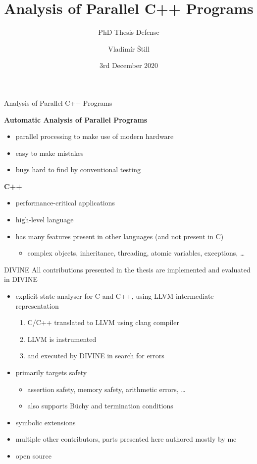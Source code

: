 \documentclass[aspectratio=169, fi]{paradise-slide}
\title{Analysis of Parallel C++ Programs}
\subtitle{PhD Thesis Defense}
\author{Vladimír Štill}
\date{3rd December 2020}
\begin{document}

\begin{frame}{Analysis of Parallel C++ Programs}

\textbf{Automatic Analysis of Parallel Programs}
\begin{itemize}
    \item parallel processing to make use of modern hardware
    \item easy to make mistakes
    \item bugs hard to find by conventional testing
\end{itemize}
\pause

\bigskip
\textbf{C++}
\begin{itemize}
  \item performance-critical applications
  \item high-level language
  \item has many features present in other languages (and not present in C)
    \begin{itemize}
      \item complex objects, inheritance, threading, atomic variables, exceptions, …
    \end{itemize}
\end{itemize}
\end{frame}

\begin{frame}{DIVINE}
  All contributions presented in the thesis are implemented and evaluated in DIVINE

  \begin{itemize}
    \item explicit-state analyser for C and C++, using LLVM intermediate representation
      \begin{enumerate}
        \item C/C++ translated to LLVM using clang compiler
        \item LLVM is instrumented
        \item and executed by DIVINE in search for errors
      \end{enumerate}\pause
    \item primarily targets safety
      \begin{itemize}
        \item assertion safety, memory safety, arithmetic errors, …
        \item also supports Büchy and termination conditions
      \end{itemize} \pause
    \item symbolic extensions
    \item multiple other contributors, parts presented here authored mostly by me
    \item open source
  \end{itemize}
\end{frame}
\end{document}

